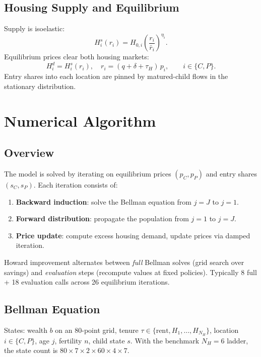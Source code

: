 \documentclass[11pt]{article}
\begin{document}
\subsection{Housing Supply and Equilibrium}

Supply is isoelastic:
\begin{equation}
H_i^s(r_i) = H_{0,i}\left(\frac{r_i}{\bar r_i}\right)^{\eta_i}.
\end{equation}
Equilibrium prices clear both housing markets:
\begin{equation}
H_i^d = H_i^s(r_i), \quad r_i = (q+\delta+\tau_H)\,p_i, \qquad i \in \{C,P\}.
\end{equation}
Entry shares into each location are pinned by matured-child flows in the stationary distribution.

\clearpage
\section{Numerical Algorithm}
\label{sec:algorithm}

\subsection{Overview}

The model is solved by iterating on equilibrium prices $(p_C, p_P)$ and entry shares $(s_C, s_P)$. Each iteration consists of:
\begin{enumerate}
	\item \textbf{Backward induction}: solve the Bellman equation from $j=J$ to $j=1$.
	\item \textbf{Forward distribution}: propagate the population from $j=1$ to $j=J$.
	\item \textbf{Price update}: compute excess housing demand, update prices via damped iteration.
\end{enumerate}
Howard improvement alternates between \emph{full} Bellman solves (grid search over savings) and \emph{evaluation} steps (recompute values at fixed policies). Typically 8 full + 18 evaluation calls across 26 equilibrium iterations.

\subsection{Bellman Equation}

States: wealth $b$ on an 80-point grid, tenure $\tau \in \{\text{rent}, H_1,\ldots,H_{N_H}\}$, location $i \in \{C,P\}$, age $j$, fertility $n$, child state $s$. With the benchmark $N_H = 6$ ladder, the state count is $80 \times 7 \times 2 \times 60 \times 4 \times 7$.
\end{document}
